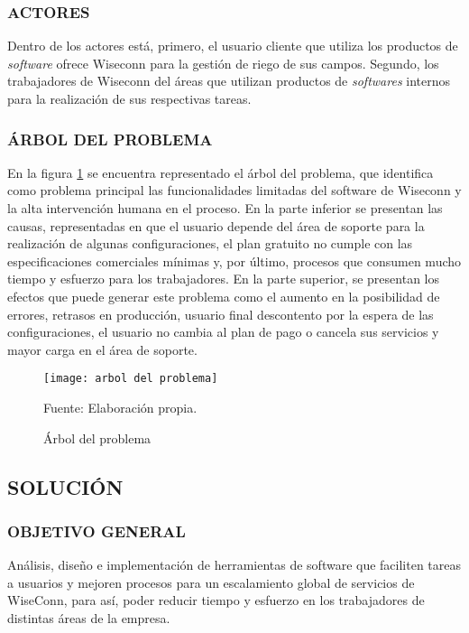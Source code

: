 \subsubsection{ACTORES}
Dentro de los actores está, primero, el usuario cliente que utiliza los productos de \textit{software} ofrece Wiseconn para la gestión de riego de sus campos. Segundo, los trabajadores de Wiseconn del áreas que utilizan productos de \textit{softwares} internos para la realización de sus respectivas tareas.

\subsubsection{ÁRBOL DEL PROBLEMA}
En la figura \ref{fig:arbolproblema} se encuentra representado el árbol del problema, que identifica como problema principal las funcionalidades limitadas del software de Wiseconn y la alta intervención humana en el proceso.
En la parte inferior se presentan las causas, representadas en que el usuario depende del área de soporte para la realización de algunas configuraciones, el plan gratuito no cumple con las especificaciones comerciales mínimas y, por último, procesos que consumen mucho tiempo y esfuerzo para los trabajadores.
En la parte superior, se presentan los efectos que puede generar este problema como el aumento en la posibilidad de errores, retrasos en producción, usuario final descontento por la espera de las configuraciones, el usuario no cambia al plan de pago o cancela sus servicios y mayor carga en el área de soporte.

\begin{figure}
    \centering
	\texttt{[image: arbol del problema]}
	\caption{\label{fig:arbolproblema} Árbol del problema} Fuente: Elaboración propia.
\end{figure}

\subsection{SOLUCIÓN}

\subsubsection{OBJETIVO GENERAL}

Análisis, diseño e implementación de herramientas de software que faciliten tareas a usuarios y mejoren procesos para un escalamiento global de servicios de WiseConn, para así, poder reducir tiempo y esfuerzo en los trabajadores de distintas áreas de la empresa.

